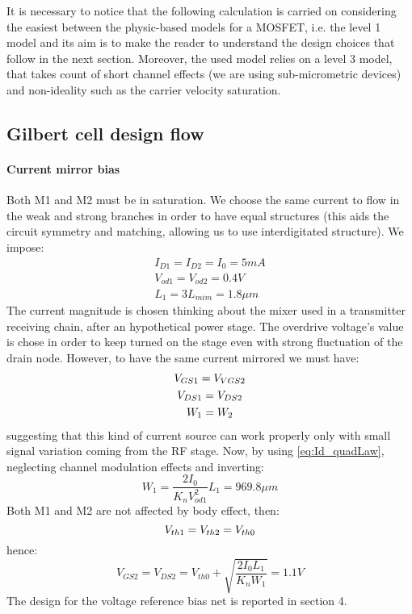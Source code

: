 It is necessary to notice that the following calculation is carried on considering the easiest between the physic-based models for a MOSFET, i.e. the level 1 model and its aim is to make the reader to understand the design choices that follow in the next section. Moreover, the used model relies on a level 3 model, that takes count of short channel effects (we are using sub-micrometric devices) and non-ideality such as the carrier velocity saturation. 

\subsection{Gilbert cell design flow} 

\paragraph{Current mirror bias}

Both M1 and M2 must be in saturation. We choose the same current to flow in the weak and strong branches in order to have equal structures (this aids the circuit symmetry and matching, allowing us to use interdigitated structure). We impose:
\begin{gather}
I_{D1} = I_{D2} = I_0 = 5 mA  \\
V_{od1}=V_{od2}=0.4 V  \\
L_1 =3 L_{mim} = 1.8 \mu m 
\end{gather} 
The current magnitude is chosen thinking about the mixer used in a transmitter receiving chain, after an hypothetical power stage. The overdrive voltage's value is chose in order to keep turned on the stage even with strong fluctuation of the drain node. However, to have the same current mirrored we must have:
\begin{gather}
	V_{GS1} = V_{VGS2} \notag \\
	V_{DS1} = V_{DS2} \notag \\
	W_1 = W_2 \notag 
\end{gather}
suggesting that this kind of current source can work properly only with small signal variation coming from the RF stage. Now, by using \ref{eq:Id_quadLaw}, neglecting channel modulation effects and inverting:
\begin{equation}
W_1 = \frac{2I_0}{K_n V_{od1}^2}L_1 = 969.8 \mu m
\end{equation}
Both M1 and M2 are not affected by body effect, then:
\begin{equation}
	V_{th1}=V_{th2}=V_{th0} \notag \\
\end{equation}
hence:
\begin{equation}
V_{GS2}=V_{DS2}= V_{th0}+\sqrt{\frac{2I_0L_1}{K_n W_1 }} = 1.1 V
\end{equation}
The design for the voltage reference bias net is reported in section 4.
